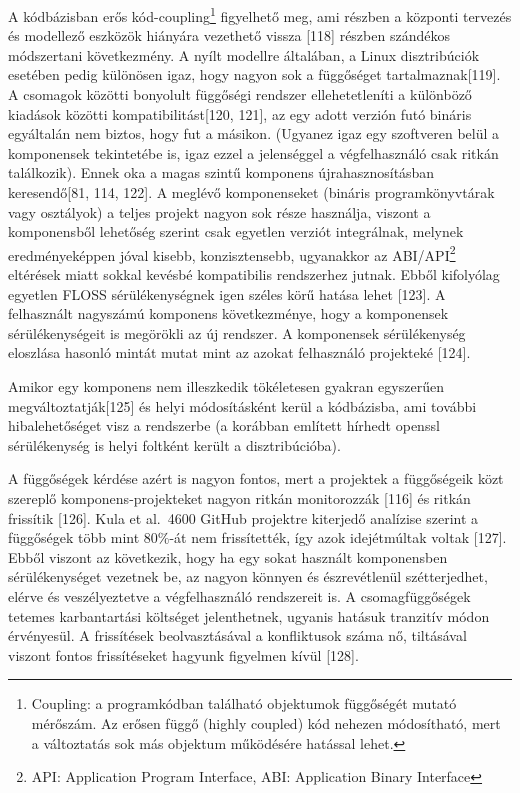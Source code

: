 \documentclass[12pt,magyar,a4paper,oneside]{scrreprt}
\begin{document}
A kódbázisban erős kód-coupling\footnote{Coupling: a programkódban
  található objektumok függőségét mutató mérőszám. Az erősen függő
  (highly coupled) kód nehezen módosítható, mert a változtatás sok más
  objektum működésére hatással lehet.} figyelhető meg, ami részben a
központi tervezés és modellező eszközök hiányára vezethető vissza
{[}118{]} részben szándékos módszertani következmény. A nyílt modellre
általában, a Linux disztribúciók esetében pedig különösen igaz, hogy
nagyon sok a függőséget tartalmaznak{[}119{]}. A csomagok közötti
bonyolult függőségi rendszer ellehetetleníti a különböző kiadások
közötti kompatibilitást{[}120, 121{]}, az egy adott verzión futó bináris
egyáltalán nem biztos, hogy fut a másikon. (Ugyanez igaz egy szoftveren
belül a komponensek tekintetébe is, igaz ezzel a jelenséggel a
végfelhasználó csak ritkán találkozik). Ennek oka a magas szintű
komponens újrahasznosításban keresendő{[}81, 114, 122{]}. A meglévő
komponenseket (bináris programkönyvtárak vagy osztályok) a teljes
projekt nagyon sok része használja, viszont a komponensből lehetőség
szerint csak egyetlen verziót integrálnak, melynek eredményeképpen jóval
kisebb, konzisztensebb, ugyanakkor az ABI/API\footnote{API: Application
  Program Interface, ABI: Application Binary Interface} eltérések miatt
sokkal kevésbé kompatibilis rendszerhez jutnak. Ebből kifolyólag
egyetlen FLOSS sérülékenységnek igen széles körű hatása lehet {[}123{]}.
A felhasznált nagyszámú komponens következménye, hogy a komponensek
sérülékenységeit is megörökli az új rendszer. A komponensek
sérülékenység eloszlása hasonló mintát mutat mint az azokat felhasználó
projekteké {[}124{]}.

Amikor egy komponens nem illeszkedik tökéletesen gyakran egyszerűen
megváltoztatják{[}125{]} és helyi módosításként kerül a kódbázisba, ami
további hibalehetőséget visz a rendszerbe (a korábban említett hírhedt
openssl sérülékenység is helyi foltként került a disztribúcióba).

A függőségek kérdése azért is nagyon fontos, mert a projektek a
függőségeik közt szereplő komponens-projekteket nagyon ritkán
monitorozzák {[}116{]} és ritkán frissítik {[}126{]}. Kula et al.~4600
GitHub projektre kiterjedő analízise szerint a függőségek több mint
80\%-át nem frissítették, így azok idejétmúltak voltak {[}127{]}. Ebből
viszont az következik, hogy ha egy sokat használt komponensben
sérülékenységet vezetnek be, az nagyon könnyen és észrevétlenül
szétterjedhet, elérve és veszélyeztetve a végfelhasználó rendszereit is.
A csomagfüggőségek tetemes karbantartási költséget jelenthetnek, ugyanis
hatásuk tranzitív módon érvényesül. A frissítések beolvasztásával a
konfliktusok száma nő, tiltásával viszont fontos frissítéseket hagyunk
figyelmen kívül {[}128{]}.
\end{document}
